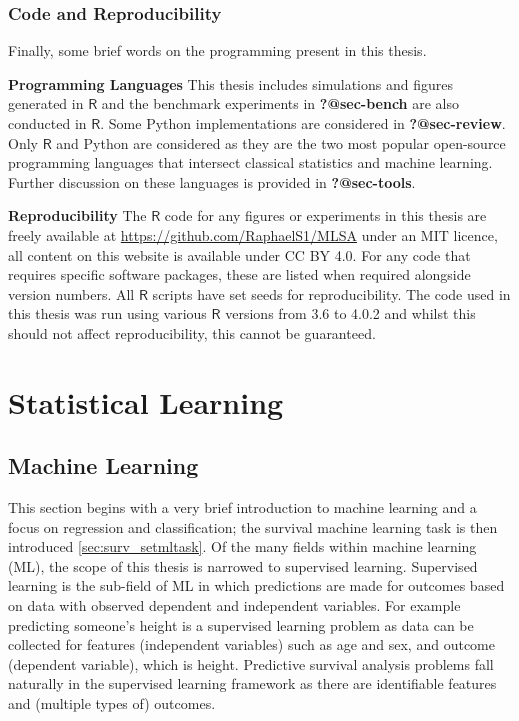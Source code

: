 \documentclass[
  letterpaper,
]{scrbook}
\theoremstyle{plain}
\theoremstyle{definition}
\theoremstyle{remark}
\begin{document}
\hypertarget{code-and-reproducibility}{%
\subsection{Code and Reproducibility}\label{code-and-reproducibility}}

Finally, some brief words on the programming present in this thesis.

\textbf{Programming Languages} This thesis includes simulations and
figures generated in \(\textsf{R}\) and the benchmark experiments in
\textbf{?@sec-bench} are also conducted in \(\textsf{R}\). Some Python
implementations are considered in \textbf{?@sec-review}. Only
\(\textsf{R}\) and Python are considered as they are the two most
popular open-source programming languages that intersect classical
statistics and machine learning. Further discussion on these languages
is provided in \textbf{?@sec-tools}.

\textbf{Reproducibility} The \(\textsf{R}\) code for any figures or
experiments in this thesis are freely available at
\url{https://github.com/RaphaelS1/MLSA} under an MIT licence, all
content on this website is available under CC BY 4.0. For any code that
requires specific software packages, these are listed when required
alongside version numbers. All \(\textsf{R}\) scripts have set seeds for
reproducibility. The code used in this thesis was run using various
\(\textsf{R}\) versions from 3.6 to 4.0.2 and whilst this should not
affect reproducibility, this cannot be guaranteed.


\hypertarget{statistical-learning}{%
\chapter{Statistical Learning}\label{statistical-learning}}

\section{Machine Learning}
\label{sec:surv_setml}

This section begins with a very brief introduction to machine learning
and a focus on regression and classification; the survival machine
learning task is then introduced \ref{sec:surv_setmltask}. Of the many
fields within machine learning (ML), the scope of this thesis is
narrowed to supervised learning. Supervised learning is the sub-field of
ML in which predictions are made for outcomes based on data with
observed dependent and independent variables. For example predicting
someone's height is a supervised learning problem as data can be
collected for features (independent variables) such as age and sex, and
outcome (dependent variable), which is height. Predictive survival
analysis problems fall naturally in the supervised learning framework as
there are identifiable features and (multiple types of) outcomes.
\end{document}
